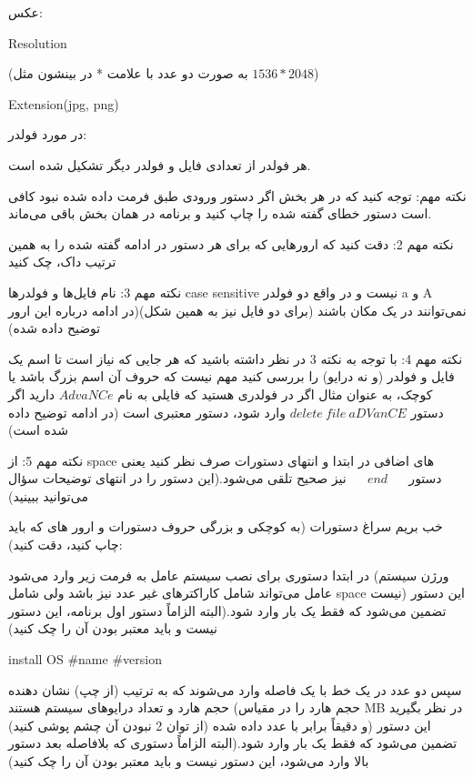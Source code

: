 \documentclass[]{article}
\begin{document}
عکس:
\begin{latin}
Resolution
\end{latin}
(به صورت دو عدد با علامت * در بینشون مثل $1536*2048$)



\begin{latin}
Extension(jpg, png)
\end{latin}


در مورد فولدر:

هر فولدر از تعدادی فایل و فولدر دیگر تشکیل شده است.

نکته مهم: توجه کنید که در هر بخش اگر دستور ورودی طبق فرمت داده شده نبود کافی است دستور خطای گفته شده را چاپ کنید و برنامه در همان بخش باقی می‌ماند.

نکته مهم 2: دقت کنید که ارورهایی که برای هر دستور در ادامه گفته شده را به همین ترتیب داک، چک کنید


نکته مهم 3: نام فایل‌ها و فولدرها case sensitive نیست و در واقع دو فولدر a و A نمی‌توانند در یک مکان باشند (برای دو فایل نیز به همین شکل)(در ادامه درباره این ارور توضیح داده شده)


نکته مهم 4: با توجه به نکته 3 در نظر داشته باشید که هر جایی که نیاز است تا اسم یک فایل و فولدر (و نه درایو) را بررسی کنید مهم نیست که حروف آن اسم بزرگ باشد یا کوچک، به عنوان مثال اگر در فولدری هستید که فایلی به نام
$AdvaNCe$
 دارید اگر دستور
 $delete~ file ~aDVanCE$
 وارد شود، دستور معتبری است (در ادامه توضیح داده شده است)


نکته مهم 5: از space های اضافی در ابتدا و انتهای دستورات صرف نظر کنید یعنی دستور $~~~~~~end~~~~~~$
نیز صحیح تلقی می‌شود.(این دستور را در انتهای توضیحات سؤال می‌توانید ببینید)

خب بریم سراغ دستورات (به کوچکی و بزرگی حروف دستورات و ارور های که باید چاپ کنید، دقت کنید):

در ابتدا دستوری برای نصب سیستم عامل به فرمت زیر وارد می‌شود (ورژن سیستم عامل می‌تواند شامل کاراکترهای غیر عدد نیز باشد ولی شامل space نیست) این دستور تضمین می‌شود که فقط یک بار وارد شود.(البته الزاماً دستور اول برنامه، این دستور نیست و باید معتبر بودن آن را چک کنید)

\begin{tcolorbox}[boxrule=0pt]
	\begin{latin}
  	  \large{
  	  	install OS \#name \#version
		}
	\end{latin}
\end{tcolorbox}

سپس دو عدد در یک خط با یک فاصله وارد می‌شوند که به ترتیب (از چپ) نشان دهنده حجم هارد و تعداد درایوهای سیستم هستند (حجم هارد را در مقیاس MB در نظر بگیرید و دقیقاً برابر با عدد داده شده (از توان 2 نبودن آن چشم پوشی کنید)) این دستور تضمین می‌شود که فقط یک بار وارد شود.(البته الزاماً دستوری که بلافاصله بعد دستور بالا وارد می‌شود، این دستور نیست و باید معتبر بودن آن را چک کنید)
\end{document}
